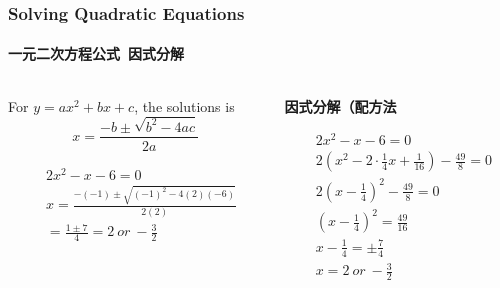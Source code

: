 \documentclass[
	11pt, %
	handout,
]{beamer}
\begin{document}
\begin{frame}
	\frametitle{Solving Quadratic Equations}
	\framesubtitle{一元二次方程公式\ 因式分解}

	\begin{columns}[t] 
		\begin{column}{0.5\textwidth} %
				\begin{theorem}[一元二次方程公式]
					For $y = ax^2 + bx + c$, the solutions is \\
					\begin{equation*}
						x=\frac{-b \pm \sqrt{b^2 - 4ac}}{2a}
					\end{equation*}
				\end{theorem}

				\begin{example}
					\begin{equation*}
						\begin{aligned}
							&2x^2 -x - 6 = 0 \\
							&x = \frac{-(-1) \pm \sqrt{(-1)^2 - 4(2)(-6)}}{2(2)} \\
							&= \frac{1 \pm 7}{4} = 2\ or\ -\frac{3}{2} 
						\end{aligned}
					\end{equation*}
				\end{example}
		\end{column}
		\begin{column}{0.5\textwidth} %
				\textbf{因式分解（配方法}

				\begin{example}
					\begin{equation*}
						\begin{aligned}
							&2x^2 -x - 6 = 0 \\
							&2(x^2 - 2 \cdot \frac{1}{4}x +  \frac{1}{16})-\frac{49}{8} = 0 \\
							&2(x - \frac{1}{4})^2-\frac{49}{8} = 0 \\
							&(x - \frac{1}{4})^2=\frac{49}{16} \\
							& x - \frac{1}{4}=\pm \frac{7}{4} \\
							&x = 2 \ or \ -\frac{3}{2}
						\end{aligned}
					\end{equation*}
				\end{example}
    \end{column}
	\end{columns}
\end{frame}
\end{document}

